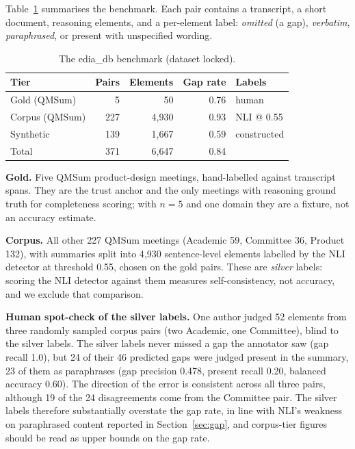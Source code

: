 \documentclass[conference]{IEEEtran}
\begin{document}
Table~\ref{tab:dataset} summarises the benchmark. Each pair contains a
transcript, a short document, reasoning elements, and a per-element label:
\emph{omitted} (a gap), \emph{verbatim}, \emph{paraphrased}, or present with
unspecified wording.

\begin{table}[t]
\caption{The edia\_db benchmark (dataset locked).}
\label{tab:dataset}
\centering
\small
\begin{tabular}{@{}lrrrl@{}}
\toprule
Tier & Pairs & Elements & Gap rate & Labels \\
\midrule
Gold (QMSum) & 5 & 50 & 0.76 & human \\
Corpus (QMSum) & 227 & 4{,}930 & 0.93 & NLI @ 0.55 \\
Synthetic & 139 & 1{,}667 & 0.59 & constructed \\
\midrule
Total & 371 & 6{,}647 & 0.84 & \\
\bottomrule
\end{tabular}
\end{table}

\textbf{Gold.} Five QMSum product-design meetings, hand-labelled against
transcript spans. They are the trust anchor and the only meetings with
reasoning ground truth for completeness scoring; with $n=5$ and one domain they
are a fixture, not an accuracy estimate.

\textbf{Corpus.} All other 227 QMSum meetings (Academic 59, Committee 36,
Product 132), with summaries split into 4{,}930 sentence-level elements labelled
by the NLI detector at threshold 0.55, chosen on the gold pairs. These are
\emph{silver} labels: scoring the NLI detector against them measures
self-consistency, not accuracy, and we exclude that comparison.

\textbf{Human spot-check of the silver labels.} One author judged 52 elements
from three randomly sampled corpus pairs (two Academic, one Committee), blind to
the silver labels. The silver labels never missed a gap the annotator saw
(gap recall 1.0), but 24 of their 46 predicted gaps were judged present in the
summary, 23 of them as paraphrases (gap precision 0.478, present recall 0.20,
balanced accuracy 0.60). The direction of the error is consistent across all
three pairs, although 19 of the 24 disagreements come from the Committee
pair. The silver labels therefore substantially overstate the gap rate, in line
with NLI's weakness on paraphrased content reported in Section~\ref{sec:gap}, and corpus-tier
figures should be read as upper bounds on the gap rate.
\end{document}
